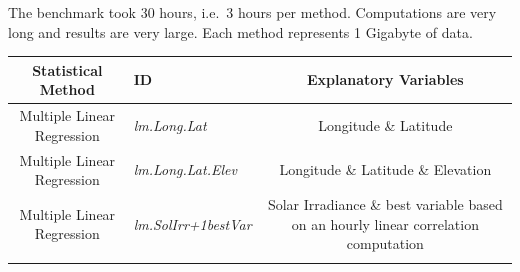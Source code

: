 \documentclass[12pt,twoside]{reedthesis}
\theoremstyle{definition}
\theoremstyle{definition}
\theoremstyle{definition}
\theoremstyle{remark}
\begin{document}
The benchmark took 30 hours, i.e.~3 hours per method. Computations are
very long and results are very large. Each method represents 1 Gigabyte
of data.
\begin{longtable}[]{@{}clc@{}}
\toprule
\begin{minipage}[b]{0.18\columnwidth}\centering\strut
Statistical Method\strut
\end{minipage} & \begin{minipage}[b]{0.21\columnwidth}\raggedright\strut
ID\strut
\end{minipage} & \begin{minipage}[b]{0.52\columnwidth}\centering\strut
Explanatory Variables\strut
\end{minipage}\tabularnewline
\midrule
\endhead
\begin{minipage}[t]{0.18\columnwidth}\centering\strut
Multiple Linear Regression\strut
\end{minipage} & \begin{minipage}[t]{0.21\columnwidth}\raggedright\strut
\emph{lm.Long.Lat}\strut
\end{minipage} & \begin{minipage}[t]{0.52\columnwidth}\centering\strut
Longitude \& Latitude\strut
\end{minipage}\tabularnewline
\begin{minipage}[t]{0.18\columnwidth}\centering\strut
Multiple Linear Regression\strut
\end{minipage} & \begin{minipage}[t]{0.21\columnwidth}\raggedright\strut
\emph{lm.Long.Lat.Elev}\strut
\end{minipage} & \begin{minipage}[t]{0.52\columnwidth}\centering\strut
Longitude \& Latitude \& Elevation\strut
\end{minipage}\tabularnewline
\begin{minipage}[t]{0.18\columnwidth}\centering\strut
Multiple Linear Regression\strut
\end{minipage} & \begin{minipage}[t]{0.21\columnwidth}\raggedright\strut
\emph{lm.SolIrr+1bestVar}\strut
\end{minipage} & \begin{minipage}[t]{0.52\columnwidth}\centering\strut
Solar Irradiance \& best variable based on an hourly linear correlation
computation\strut
\end{minipage}\tabularnewline
\begin{minipage}[t]{0.18\columnwidth}\centering\strut

\end{minipage}
\end{longtable}
\end{document}
